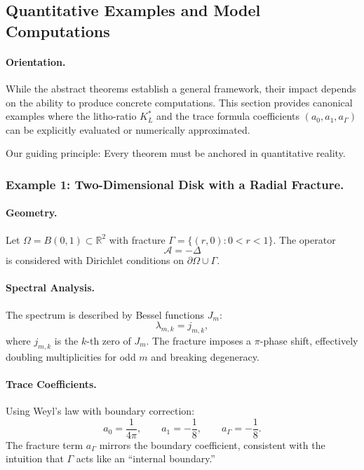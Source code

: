 
\subsection{Quantitative Examples and Model Computations}

\paragraph{Orientation.}
While the abstract theorems establish a general framework, their
impact depends on the ability to produce concrete computations.
This section provides canonical examples where the litho-ratio $K_L^*$
and the trace formula coefficients $(a_0, a_1, a_\Gamma)$ can be
explicitly evaluated or numerically approximated.

Our guiding principle: Every theorem must be anchored in
quantitative reality.


\subsubsection{Example 1: Two-Dimensional Disk with a Radial Fracture.}

\paragraph{Geometry.}
Let $\Omega = B(0,1) \subset \mathbb{R}^2$ with fracture
$\Gamma = \{(r,0): 0<r<1\}$. The operator
\[
\mathcal{A} = -\Delta
\]
is considered with Dirichlet conditions on $\partial \Omega \cup \Gamma$.

\paragraph{Spectral Analysis.}
The spectrum is described by Bessel functions $J_m$:
\[
\lambda_{m,k} = j_{m,k},
\]
where $j_{m,k}$ is the $k$-th zero of $J_m$.
The fracture imposes a $\pi$-phase shift, effectively doubling
multiplicities for odd $m$ and breaking degeneracy.

\paragraph{Trace Coefficients.}
Using Weyl’s law with boundary correction:
\[
a_0 = \frac{1}{4\pi}, \qquad
a_1 = -\frac{1}{8}, \qquad
a_\Gamma = -\frac{1}{8}.
\]
The fracture term $a_\Gamma$ mirrors the boundary coefficient,
consistent with the intuition that $\Gamma$ acts like an “internal boundary.”

